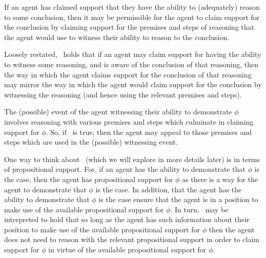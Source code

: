 \begin{note}[\EASw{}]
  \begin{proposition}[\EASw{-} --- \EASw{}]\label{prop:EASw}
    If an agent has claimed support that they have the ability to (adequately) reason to some conclusion, then it may be permissible for the agent to claim support for the conclusion by claiming support for the premises and steps of reasoning that the agent would use to witness their ability to reason to the conclusion.
  \end{proposition}

  Loosely restated,~\EASw{} holds that if an agent may claim support for having the ability to witness some reasoning, and is aware of the conclusion of that reasoning, then the way in which the agent claims support for the conclusion of that reasoning may mirror the way in which the agent would claim support for the conclusion by witnessing the reasoning (and hence using the relevant premises and steps).

  The (possible) event of the agent witnessing their ability to demonstrate \(\phi\) involves reasoning with various premises and steps which culminate in claiming support for \(\phi\).
  So, if~\EASw{} is true, then the agent may appeal to those premises and steps which are used in the (possible) witnessing event.

  One way to think about~\EASw{} (which we will explore in more details later) is in terms of propositional support.
  For, if an agent has the ability to demonstrate that \(\phi\) is the case, then the agent has propositional support for \(\phi\) as there is a way for the agent to demonstrate that \(\phi\) is the case.
  In addition, that the agent has the ability to demonstrate that \(\phi\) is the case ensure that the agent is in a position to make use of the available propositional support for \(\phi\).
  In turn,~\EAS{} may be interpreted to hold that so long as the agent has such information about their position to make use of the available propositional support for \(\phi\) then the agent does not need to reason with the relevant propositional support in order to claim support for \(\phi\) in virtue of the available propositional support for \(\phi\).
\end{note}

